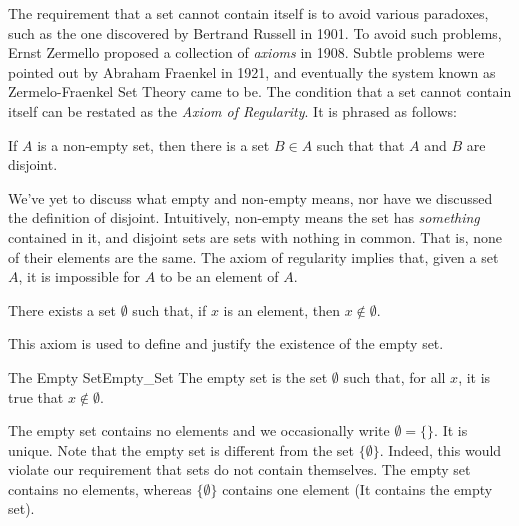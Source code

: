     The requirement that a set cannot contain itself is to avoid various
    paradoxes, such as the one discovered by Bertrand Russell in 1901. To
    avoid such problems, Ernst Zermello proposed a collection of
    \textit{axioms} in 1908. Subtle problems were pointed out by Abraham
    Fraenkel in 1921, and eventually the system known as Zermelo-Fraenkel
    Set Theory came to be. The condition that a set cannot contain itself can
    be restated as the \textit{Axiom of Regularity}. It is phrased as follows:
    \begin{axiom}
        \label{ax:Axiom_of_Regularity}%
        If $A$ is a non-empty set, then there is a set $B\in{A}$
        such that that $A$ and $B$ are disjoint.
    \end{axiom}
    We've yet to discuss what empty and non-empty means, nor have we discussed
    the definition of disjoint. Intuitively, non-empty means the set has
    \textit{something} contained in it, and disjoint sets are sets with
    nothing in common. That is, none of their elements are the same. The axiom
    of regularity implies that, given a set $A$, it is impossible for $A$
    to be an element of $A$.
    \begin{axiom}
        \label{ax:Axiom_of_the_Empty_Set}%
        There exists a set $\emptyset$ such that, if $x$ is an element,
        then $x\notin\emptyset$.
    \end{axiom}
    This axiom is used to define and justify the existence of the empty set.
    \begin{ldefinition}{The Empty Set}{Empty_Set}
        The \gls{empty set} is the set $\emptyset$ such that,
        for all $x$, it is true that $x\notin\emptyset$.
    \end{ldefinition}
    The empty set contains no elements and we occasionally write
    $\emptyset=\{\}$. It is unique. Note that the empty set is different from
    the set $\{\emptyset\}$. Indeed, this would violate our requirement that
    sets do not contain themselves. The empty set contains no elements,
    whereas $\{\emptyset\}$ contains one element (It contains the empty set).
